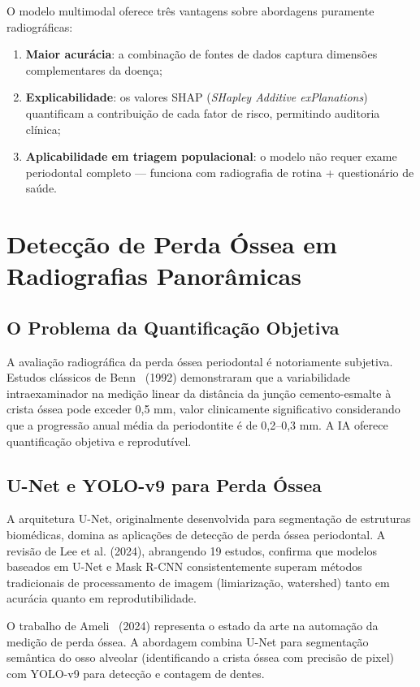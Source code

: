 O modelo multimodal oferece três vantagens sobre abordagens puramente radiográficas:
\begin{enumerate}
    \item \textbf{Maior acurácia}: a combinação de fontes de dados captura dimensões complementares da doença;
    \item \textbf{Explicabilidade}: os valores SHAP (\textit{SHapley Additive exPlanations}) quantificam a contribuição de cada fator de risco, permitindo auditoria clínica;
    \item \textbf{Aplicabilidade em triagem populacional}: o modelo não requer exame periodontal completo --- funciona com radiografia de rotina + questionário de saúde.
\end{enumerate}

\section{Detecção de Perda Óssea em Radiografias Panorâmicas}

\subsection{O Problema da Quantificação Objetiva}

A avaliação radiográfica da perda óssea periodontal é notoriamente subjetiva. Estudos clássicos de Benn~\cite{benn1992} (1992) demonstraram que a variabilidade intraexaminador na medição linear da distância da junção cemento-esmalte à crista óssea pode exceder 0,5 mm, valor clinicamente significativo considerando que a progressão anual média da periodontite é de 0,2--0,3 mm. A IA oferece quantificação objetiva e reprodutível.

\subsection{U-Net e YOLO-v9 para Perda Óssea}

A arquitetura U-Net, originalmente desenvolvida para segmentação de estruturas biomédicas, domina as aplicações de detecção de perda óssea periodontal. A revisão de Lee et al. (2024), abrangendo 19 estudos, confirma que modelos baseados em U-Net e Mask R-CNN consistentemente superam métodos tradicionais de processamento de imagem (limiarização, watershed) tanto em acurácia quanto em reprodutibilidade.

O trabalho de Ameli~\cite{ameli2024} (2024) representa o estado da arte na automação da medição de perda óssea. A abordagem combina U-Net para segmentação semântica do osso alveolar (identificando a crista óssea com precisão de pixel) com YOLO-v9 para detecção e contagem de dentes.

